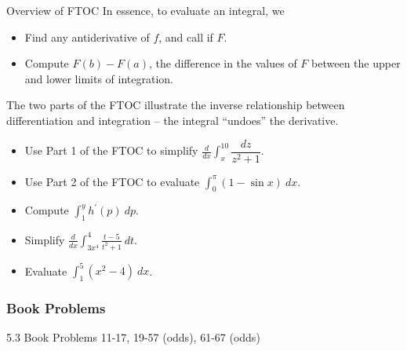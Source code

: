 \documentclass[cal1spr16Lectures.tex]{subfiles}
\begin{document}
\begin{frame}{\small Overview of FTOC}\small
In essence, to evaluate an integral, we
\begin{itemize}
\item Find any antiderivative of $f$, and call if $F$.
\item Compute $F(b)-F(a)$, the difference in the values of $F$ between the upper and lower limits of integration.
\end{itemize}
The two parts of the FTOC illustrate the inverse relationship between differentiation and integration -- the integral ``undoes'' the derivative.
\end{frame}

\begin{frame}
\begin{ex}
\begin{itemize}\small
\item[(1)] Use Part 1 of the FTOC to simplify $\displaystyle\frac{d}{dx} \int_x^{10} \dfrac{dz}{z^2+1}$.

\vspace{0.75pc}
\item[(2)]  Use Part 2 of the FTOC to evaluate $\displaystyle\int_0^{\pi} (1-\sin x)\ dx.$

\vspace{0.75pc}
\item[(3)] Compute $\displaystyle\int_1^y h^{\prime}(p)\ dp$.
\end{itemize}
\end{ex}
\end{frame}

\begin{frame}
\begin{exe}
\begin{itemize}
\item[(1)] Simplify $\displaystyle\frac{d}{dx}\int_{3x^4}^{4}\frac{t-5}{t^2+1}\ dt$.

\vspace{0.5pc}
\item[(2)] Evaluate $\displaystyle\int_1^5(x^2-4)\ dx$.
\end{itemize}
\end{exe}
\end{frame}

\subsubsection{Book Problems}

\begin{frame}
\begin{block}{5.3 Book Problems}
11-17, 19-57 (odds), 61-67 (odds)
\end{block}
\end{frame}
\end{document}
